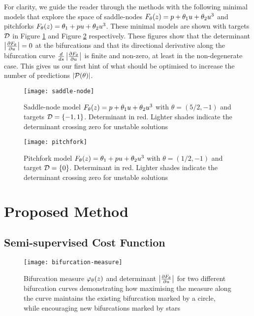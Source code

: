 For clarity, we guide the reader through the methods with the following minimal models that explore the space of saddle-nodes $F_{\theta}(z) = p + \theta_{1}u+\theta_{2}u^3$ and pitchforks $F_{\theta}(z) = \theta_{1} + p u+\theta_{2}u^3$. These minimal models are shown with targets $\mathcal{D}$ in Figure \ref{fig:saddle-node} and Figure \ref{fig:pitchfork} respectively. These figures show that the determinant $\left| \frac{\partial F_{\theta}}{\partial u} \right|=0$ at the bifurcations and that its directional derivative along the bifurcation curve $\frac{d}{ds}\left| \frac{\partial F_{\theta}}{\partial u} \right|$ is finite and non-zero, at least in the non-degenerate case. This gives us our first hint of what should be optimised to increase the number of predictions $|\mathcal{P}(\theta)|$.

\begin{figure}
\centering
\texttt{[image: saddle-node]}
\caption{Saddle-node model $F_{\theta}(z) = p + \theta_{1}u+\theta_{2}u^3$ with $\theta=(5/2,-1)$ and targets $\mathcal{D}=\{-1,1\}$. Determinant in red. Lighter shades indicate the determinant crossing zero for unstable solutions}
\label{fig:saddle-node}
\end{figure}

\begin{figure}
\centering
\texttt{[image: pitchfork]}
\caption{Pitchfork model $F_{\theta}(z) = \theta_{1} + p u+\theta_{2}u^3$ with $\theta=(1/2,-1)$ and target $\mathcal{D}=\{0\}$. Determinant in red. Lighter shades indicate the determinant crossing zero for unstable solutions}
\label{fig:pitchfork}
\end{figure}

\section{Proposed Method}
\subsection{Semi-supervised Cost Function}

\begin{figure}
    \centering
    \texttt{[image: bifurcation-measure]}
    \caption{Bifurcation measure $\varphi_{\theta}(z)$ and determinant $\left| \frac{\partial F_{\theta}}{\partial u} \right|$ for two different bifurcation curves demonstrating how maximising the measure along the curve maintains the existing bifurcation marked by a circle, while encouraging new bifurcations marked by stars}
    \label{fig:bifurcation-measure}
\end{figure}

